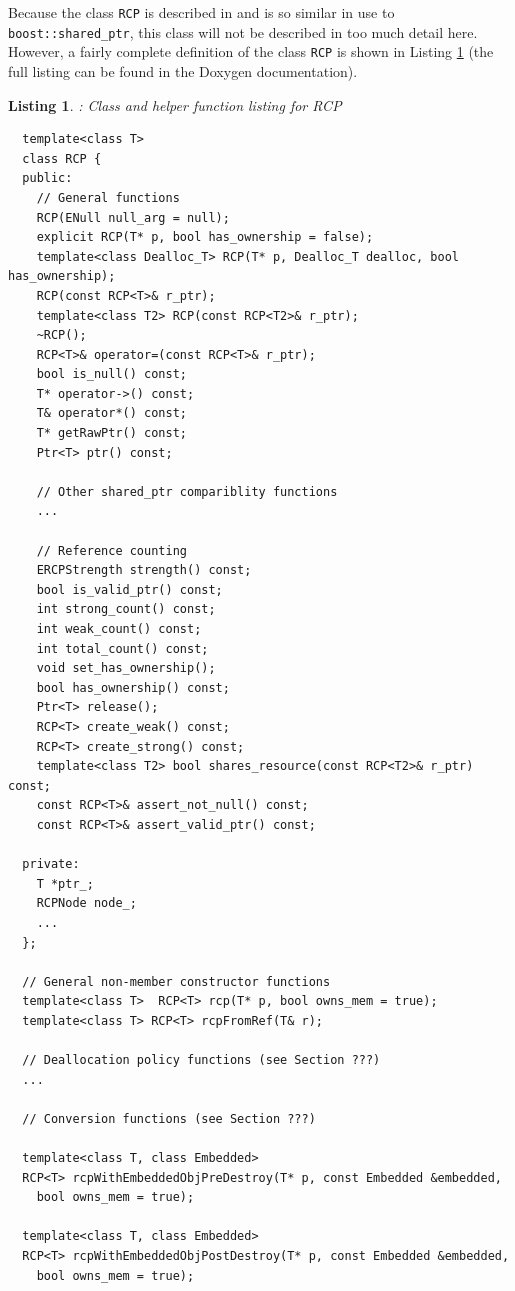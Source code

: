 \documentclass[pdf,ps2pdf,11pt]{SANDreport}
\newtheorem{listing}{Listing}
\begin{document}
Because the class {}\texttt{RCP} is described in
{}\cite{RefCountPtrBeginnersGuide} and is so similar in use to
{}\texttt{boost::shared\_ptr}, this class will not be described in too
much detail here.  However, a fairly complete definition of the class
{}\texttt{RCP} is shown in Listing {}\ref{listing:RCP} (the full
listing can be found in the Doxygen documentation).

\begin{listing}: Class and helper function listing for RCP \\
\label{listing:RCP}
{\small\begin{verbatim}
  template<class T>
  class RCP {
  public:
    // General functions
    RCP(ENull null_arg = null);
    explicit RCP(T* p, bool has_ownership = false);
    template<class Dealloc_T> RCP(T* p, Dealloc_T dealloc, bool has_ownership);
    RCP(const RCP<T>& r_ptr);
    template<class T2> RCP(const RCP<T2>& r_ptr);
    ~RCP();
    RCP<T>& operator=(const RCP<T>& r_ptr);
    bool is_null() const;
    T* operator->() const;
    T& operator*() const;
    T* getRawPtr() const;
    Ptr<T> ptr() const;
  
    // Other shared_ptr compariblity functions
    ...
  
    // Reference counting 
    ERCPStrength strength() const;
    bool is_valid_ptr() const;
    int strong_count() const;
    int weak_count() const;
    int total_count() const;
    void set_has_ownership();
    bool has_ownership() const;
    Ptr<T> release();
    RCP<T> create_weak() const;
    RCP<T> create_strong() const;
    template<class T2> bool shares_resource(const RCP<T2>& r_ptr) const;
    const RCP<T>& assert_not_null() const;
    const RCP<T>& assert_valid_ptr() const;
  
  private:
    T *ptr_;
    RCPNode node_;
    ...
  };

  // General non-member constructor functions
  template<class T>  RCP<T> rcp(T* p, bool owns_mem = true);
  template<class T> RCP<T> rcpFromRef(T& r);

  // Deallocation policy functions (see Section ???)
  ...
 
  // Conversion functions (see Section ???)
 
  template<class T, class Embedded>
  RCP<T> rcpWithEmbeddedObjPreDestroy(T* p, const Embedded &embedded,
    bool owns_mem = true);
  
  template<class T, class Embedded>
  RCP<T> rcpWithEmbeddedObjPostDestroy(T* p, const Embedded &embedded,
    bool owns_mem = true);
  

\end{verbatim}}
\end{listing}
\end{document}
